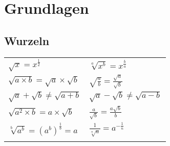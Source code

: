 \documentclass[../main.tex]{subfiles}
\begin{document}
\chapter{Grundlagen}

\section{Wurzeln}

\begin{tabularx}{1\textwidth} { 
     >{\centering\arraybackslash}X 
     >{\centering\arraybackslash}X  }
    \begin{math}
        \sqrt{x} =  x^\frac{1}{2}
    \end{math}
    &
    \begin{math}
        \sqrt[a]{x^b} = x^\frac{b}{a}
    \end{math}
    \\ [7pt]
    \begin{math}
        \sqrt{a \times b} = \sqrt{a} \times \sqrt{b}
    \end{math}
    &
    \begin{math}
      \sqrt{\frac{a}{b}} = \frac{\sqrt{a}}{\sqrt{b}}
    \end{math}
    \\ [7pt]
    \begin{math}
        \sqrt{a} + \sqrt{b} \ne  \sqrt{a+b}
    \end{math}
    &
    \begin{math}
        \sqrt{a} - \sqrt{b} \ne  \sqrt{a-b}
    \end{math}
    \\ [7pt]
    \begin{math}
        \sqrt{a^2 \times b} = a \times \sqrt{b}
    \end{math}
    &
    \begin{math}
        \frac{a}{\sqrt{b}} = \frac{a \sqrt{b}}{b}
    \end{math}
    \\ [7pt]
    \begin{math}
        \sqrt[b]{a^b} = ({a^b})^{\frac{1}{b}} = a
    \end{math}
    &
    \begin{math}
        \frac{1}{\sqrt[n]{a}} = a^{-\frac{1}{n}}
    \end{math}
    \\ [7pt]
    \begin{math}
        {}
    \end{math}
    &
    \begin{math}
        {}
    \end{math}
    \\ [7pt]
\end{tabularx}
\end{document}
